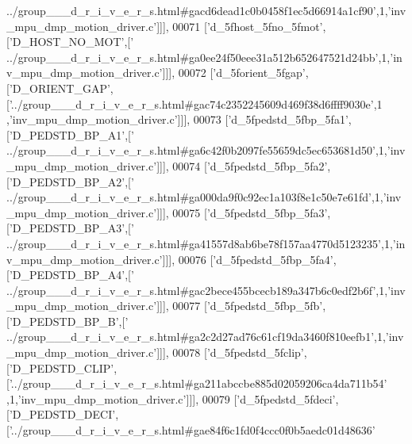 \begin{DoxyCode}
{      ../group\_\_\_d\_r\_i\_v\_e\_r\_s.html#gacd6dead1c0b0458f1ec5d66914a1cf90'},1,\textcolor{stringliteral}{'inv\_mpu\_dmp\_motion\_driver.c'}]]],
00071   [\textcolor{stringliteral}{'d\_5fhost\_5fno\_5fmot'},[\textcolor{stringliteral}{'D\_HOST\_NO\_MOT'},[\textcolor{stringliteral}{'
      ../group\_\_\_d\_r\_i\_v\_e\_r\_s.html#ga0ee24f50eee31a512b652647521d24bb'},1,\textcolor{stringliteral}{'inv\_mpu\_dmp\_motion\_driver.c'}]]],
00072   [\textcolor{stringliteral}{'d\_5forient\_5fgap'},[\textcolor{stringliteral}{'D\_ORIENT\_GAP'},[\textcolor{stringliteral}{'../group\_\_\_d\_r\_i\_v\_e\_r\_s.html#gac74c2352245609d469f38d6ffff9030e'},1
      ,\textcolor{stringliteral}{'inv\_mpu\_dmp\_motion\_driver.c'}]]],
00073   [\textcolor{stringliteral}{'d\_5fpedstd\_5fbp\_5fa1'},[\textcolor{stringliteral}{'D\_PEDSTD\_BP\_A1'},[\textcolor{stringliteral}{'
      ../group\_\_\_d\_r\_i\_v\_e\_r\_s.html#ga6c42f0b2097fe55659dc5ec653681d50'},1,\textcolor{stringliteral}{'inv\_mpu\_dmp\_motion\_driver.c'}]]],
00074   [\textcolor{stringliteral}{'d\_5fpedstd\_5fbp\_5fa2'},[\textcolor{stringliteral}{'D\_PEDSTD\_BP\_A2'},[\textcolor{stringliteral}{'
      ../group\_\_\_d\_r\_i\_v\_e\_r\_s.html#ga000da9f0c92ec1a103f8e1c50e7e61fd'},1,\textcolor{stringliteral}{'inv\_mpu\_dmp\_motion\_driver.c'}]]],
00075   [\textcolor{stringliteral}{'d\_5fpedstd\_5fbp\_5fa3'},[\textcolor{stringliteral}{'D\_PEDSTD\_BP\_A3'},[\textcolor{stringliteral}{'
      ../group\_\_\_d\_r\_i\_v\_e\_r\_s.html#ga41557d8ab6be78f157aa4770d5123235'},1,\textcolor{stringliteral}{'inv\_mpu\_dmp\_motion\_driver.c'}]]],
00076   [\textcolor{stringliteral}{'d\_5fpedstd\_5fbp\_5fa4'},[\textcolor{stringliteral}{'D\_PEDSTD\_BP\_A4'},[\textcolor{stringliteral}{'
      ../group\_\_\_d\_r\_i\_v\_e\_r\_s.html#gac2bece455bcecb189a347b6c0edf2b6f'},1,\textcolor{stringliteral}{'inv\_mpu\_dmp\_motion\_driver.c'}]]],
00077   [\textcolor{stringliteral}{'d\_5fpedstd\_5fbp\_5fb'},[\textcolor{stringliteral}{'D\_PEDSTD\_BP\_B'},[\textcolor{stringliteral}{'
      ../group\_\_\_d\_r\_i\_v\_e\_r\_s.html#ga2c2d27ad76c61cf19da3460f810eefb1'},1,\textcolor{stringliteral}{'inv\_mpu\_dmp\_motion\_driver.c'}]]],
00078   [\textcolor{stringliteral}{'d\_5fpedstd\_5fclip'},[\textcolor{stringliteral}{'D\_PEDSTD\_CLIP'},[\textcolor{stringliteral}{'../group\_\_\_d\_r\_i\_v\_e\_r\_s.html#ga211abccbe885d02059206ca4da711b54'}
      ,1,\textcolor{stringliteral}{'inv\_mpu\_dmp\_motion\_driver.c'}]]],
00079   [\textcolor{stringliteral}{'d\_5fpedstd\_5fdeci'},[\textcolor{stringliteral}{'D\_PEDSTD\_DECI'},[\textcolor{stringliteral}{'../group\_\_\_d\_r\_i\_v\_e\_r\_s.html#gae84f6c1fd0f4ccc0f0b5aedc01d48636'}

\end{DoxyCode}
